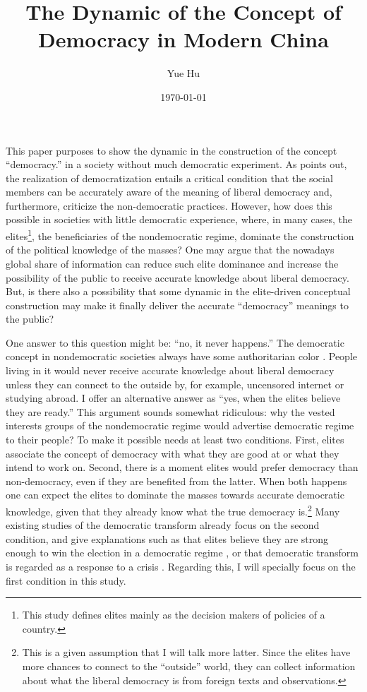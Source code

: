 \documentclass[abstracton,UTF8]{ctexart}
\author{Yue Hu}
\begin{document}
	\title{The Dynamic of the Concept of Democracy in Modern China}
	\date{\today}
	\maketitle
	
	\setlength{\parindent}{2em} %

This paper purposes to show the dynamic in the construction of the concept ``democracy.'' in a society without much democratic experiment. As \citet{Diamond2006} points out, the realization of democratization entails a critical condition that the social members can be accurately aware of the meaning of liberal democracy and, furthermore, criticize the non-democratic practices. However, how does this possible in societies with little democratic experience, where, in many cases, the elites\footnote{This study defines elites mainly as the decision makers of policies of a country.}, the beneficiaries of the nondemocratic regime, dominate the construction of the political knowledge of the masses? One may argue that the nowadays global share of information can reduce such elite dominance and increase the possibility of the public to receive accurate knowledge about liberal democracy. But, is there also a possibility that some dynamic in the elite-driven conceptual construction may make it finally deliver the accurate  ``democracy'' meanings to the public?  

One answer to this question might be: ``no, it never happens.'' The democratic concept in nondemocratic societies always have some authoritarian color \citep{Lu2014a}. People living in it would never receive accurate knowledge about liberal democracy unless they can connect to the outside by, for example, uncensored internet or studying abroad. I offer an alternative answer as ``yes, when the elites believe they are ready.'' This argument sounds somewhat ridiculous: why the vested interests groups of the nondemocratic regime would advertise democratic regime to their people? To make it possible needs at least two conditions. First, elites associate the concept of democracy with what they are good at or what they intend to work on. Second, there is a moment elites would prefer democracy than non-democracy, even if they are benefited from the latter. When both happens one can expect the elites to dominate the masses towards accurate democratic knowledge, given that they already know what the true democracy is.\footnote{This is a given assumption that I will talk more latter. Since the elites have more chances to connect to the ``outside'' world, they can collect information about what the liberal democracy is from foreign texts and observations.} Many existing studies of the democratic transform already focus on the second condition, and give explanations such as that elites believe they are strong enough to win the election in a democratic regime \citep{Magaloni2006}, or that democratic transform is regarded as a response to a crisis \citep{Przeworski2000,ODonnell2013,Salame1994}. Regarding this, I will specially focus on the first condition in this study.
\end{document}

